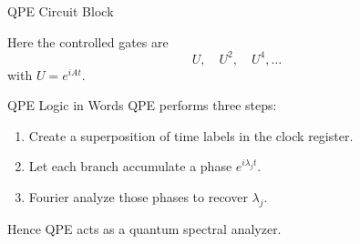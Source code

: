 \documentclass{beamer}
\begin{document}

\begin{frame}{QPE Circuit Block}
\centering
{}

Here the controlled gates are
\[
U,\quad U^2,\quad U^4,\dots
\]
with \(U=e^{iAt}\).
\end{frame}


\begin{frame}{QPE Logic in Words}
QPE performs three steps:
\begin{enumerate}
\item Create a superposition of time labels in the clock register.
\item Let each branch accumulate a phase \(e^{i\lambda_j t}\).
\item Fourier analyze those phases to recover \(\lambda_j\).
\end{enumerate}

Hence QPE acts as a quantum spectral analyzer.
\end{frame}
\end{document}
